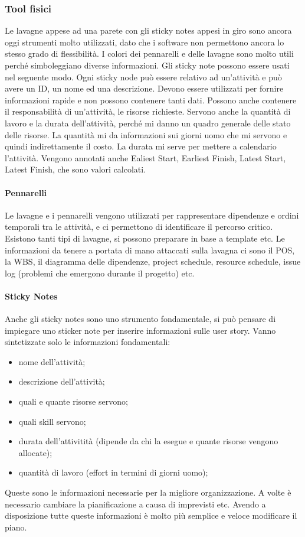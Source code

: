\subsubsection{Tool fisici}
Le lavagne appese ad una parete con gli sticky notes appesi in giro sono ancora oggi strumenti molto utilizzati, dato che i software non permettono ancora lo stesso grado di flessibilità. I colori dei pennarelli e delle lavagne sono molto utili perché simboleggiano diverse informazioni. Gli sticky note possono essere usati nel seguente modo. Ogni sticky node può essere relativo ad un'attività e può avere un ID, un nome ed una descrizione. Devono essere utilizzati per fornire informazioni rapide e non possono contenere tanti dati. Possono anche contenere il responsabilità di un'attività, le risorse richieste. Servono anche la quantità di lavoro e la durata dell'attività, perché mi danno un quadro generale delle stato delle risorse. La quantità mi da informazioni sui giorni uomo che mi servono e quindi indirettamente il costo. La durata mi serve per mettere a calendario l'attività. Vengono annotati anche Ealiest Start, Earliest Finish, Latest Start, Latest Finish, che sono valori calcolati.
\paragraph{Pennarelli}
Le lavagne e i pennarelli vengono utilizzati per rappresentare dipendenze e ordini temporali tra le attività, e ci permettono di identificare il percorso critico.
\noindent Esistono tanti tipi di lavagne, si possono preparare in base a template etc.
Le informazioni da tenere a portata di mano attaccati sulla lavagna ci sono il POS, la WBS, il diagramma delle dipendenze, project schedule, resource schedule, issue log (problemi che emergono durante il progetto) etc.
\paragraph{Sticky Notes}
Anche gli sticky notes sono uno strumento fondamentale, si può pensare di impiegare uno sticker note per inserire informazioni sulle user story. Vanno sintetizzate solo le informazioni fondamentali:
\begin{itemize}
	\item nome dell'attività;
	\item descrizione dell'attività;
	\item quali e quante risorse servono;
	\item quali skill servono;
	\item durata dell'attivitità (dipende da chi la esegue e quante risorse vengono allocate);
	\item quantità di lavoro (effort in termini di giorni uomo);
\end{itemize}
\noindent Queste sono le informazioni necessarie per la migliore organizzazione. A volte è necessario cambiare la pianificazione a causa di imprevisti etc. Avendo a disposizione tutte queste informazioni è molto più semplice e veloce modificare il piano.
